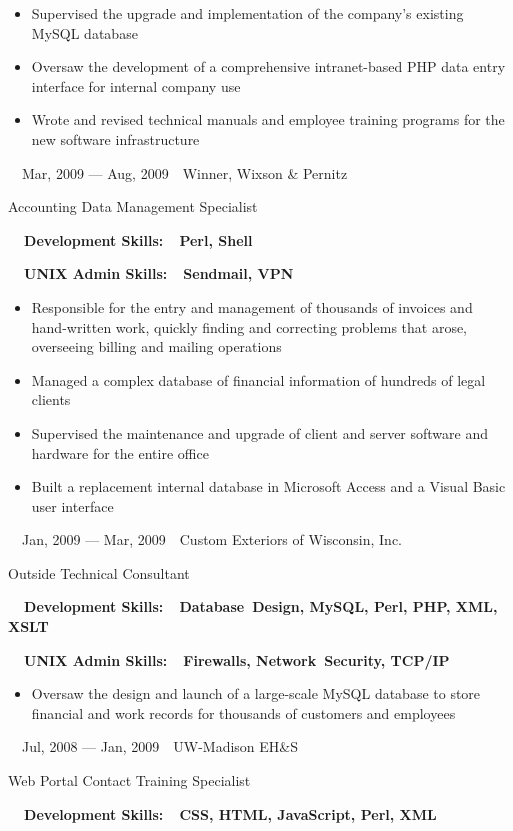 \documentclass[letterpaper]{article}
\newcommand\liststyleLi{%
\renewcommand\labelitemi{${\bullet}$}
\renewcommand\labelitemii{${\circ}$}
\renewcommand\labelitemiii{${\blacksquare}$}
\renewcommand\labelitemiv{${\bullet}$}
}
\begin{document}
\liststyleLi
\begin{itemize}
\item Supervised the upgrade and implementation of the company's existing MySQL database
\item Oversaw the development of a comprehensive intranet-based PHP data entry interface for internal company use
\item Wrote and revised technical manuals and employee training programs for the new software infrastructure
\end{itemize}
\ \ Mar, 2009 --- Aug, 2009\ \ Winner, Wixson \& Pernitz

Accounting Data Management Specialist

{\bfseries
\ \ Development Skills:\ \ Perl, Shell}

{\bfseries
\ \ UNIX Admin Skills:\ \ Sendmail, VPN}

\liststyleLi
\begin{itemize}
\item Responsible for the entry and management of thousands of invoices and hand-written work, quickly finding and correcting problems that arose, overseeing billing and mailing operations
\item Managed a complex database of financial information of hundreds of legal clients
\item Supervised the maintenance and upgrade of client and server software and hardware for the entire office
\item Built a replacement internal database in Microsoft Access and a Visual Basic user interface
\end{itemize}
\ \ Jan, 2009 --- Mar, 2009\ \ Custom Exteriors of Wisconsin, Inc.

Outside Technical Consultant

{\bfseries
\ \ Development Skills:\ \ Database~Design, MySQL, Perl, PHP, XML, XSLT}

{\bfseries
\ \ UNIX Admin Skills:\ \ Firewalls, Network~Security, TCP/IP}

\liststyleLi
\begin{itemize}
\item Oversaw the design and launch of a large-scale MySQL database to store financial and work records for thousands of customers and employees
\end{itemize}
\ \ Jul, 2008 --- Jan, 2009\ \ UW-Madison EH\&S

Web Portal Contact Training Specialist

{\bfseries
\ \ Development Skills:\ \ CSS, HTML, JavaScript, Perl, XML}
\end{document}
